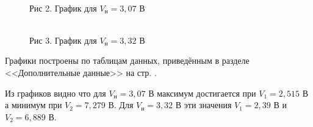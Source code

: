 \documentclass[12pt]{article}
\begin{document}
      \begin{figure}[h!]
        \begin{minipage}[h]{0.49\linewidth}
            \\
            Рис 2. График для $V_н = 3,07$ В
        \end{minipage}
        \begin{minipage}[h]{0.49\linewidth}
            \\
            Рис 3. График для $V_н = 3,32$ В
        \end{minipage}
        \label{fig:static_plots}
      \end{figure}

      Графики построены по таблицам данных, приведённым в разделе
      <<Дополнительные данные>> на стр. \pageref{table:static_method}.

      Из графиков видно что для $V_н = 3,07$ В максимум достигается при
      $V_1 = 2,515$ В а минимум при $V_2 = 7,279$ В.
      Для $V_н = 3,32$ В эти значения $V_1 = 2,39$ В и $V_2 = 6,889$ В.
\end{document}
